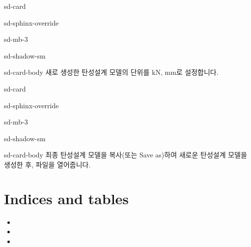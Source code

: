 \documentclass[a4paper,10pt,korean]{sphinxmanual}
\begin{document}
\begin{figure}[htbp]
\centering
\capstart

\noindent{}
\caption{}\label{\detokenize{2_naming_rules:id2}}\end{figure}

\begin{sphinxuseclass}{sd-card}
\begin{sphinxuseclass}{sd-sphinx-override}
\begin{sphinxuseclass}{sd-mb-3}
\begin{sphinxuseclass}{sd-shadow-sm}
\begin{sphinxuseclass}{sd-card-body}
\sphinxAtStartPar
새로 생성한 탄성설계 모델의 단위를 kN, mm로 설정합니다.

\end{sphinxuseclass}
\end{sphinxuseclass}
\end{sphinxuseclass}
\end{sphinxuseclass}
\end{sphinxuseclass}
\begin{sphinxuseclass}{sd-card}
\begin{sphinxuseclass}{sd-sphinx-override}
\begin{sphinxuseclass}{sd-mb-3}
\begin{sphinxuseclass}{sd-shadow-sm}
\begin{sphinxuseclass}{sd-card-body}
\sphinxAtStartPar
최종 탄성설계 모델을 복사(또는 Save as)하여 새로운 탄성설계 모델을 생성한 후, 파일을 열어줍니다.

\end{sphinxuseclass}
\end{sphinxuseclass}
\end{sphinxuseclass}
\end{sphinxuseclass}
\end{sphinxuseclass}

\chapter{Indices and tables}
\label{\detokenize{index:indices-and-tables}}\begin{itemize}
\item {} 
\sphinxAtStartPar
{}

\item {} 
\sphinxAtStartPar
{}

\item {} 
\sphinxAtStartPar
{}

\end{itemize}



\renewcommand{\indexname}{색인}
\printindex
\end{document}
